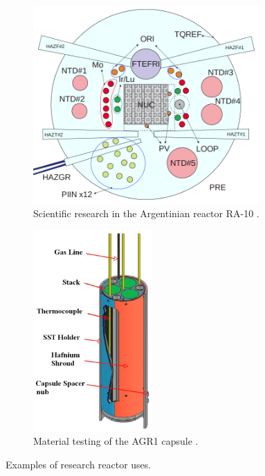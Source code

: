 \begin{figure}[htbp!] %
  \centering
  \begin{subfigure}[b]{0.49\textwidth}
    \centering
    \includegraphics[width=0.95\textwidth]{figures/RA-10}
    \caption{Scientific research in the Argentinian reactor RA-10 \cite{ra10}.}
  \end{subfigure}
  \hfill
  \begin{subfigure}[b]{0.49\textwidth}
    \centering
    \includegraphics[width=0.50\textwidth]{figures/agr1}
    \caption{Material testing of the \gls*{AGR1} capsule \cite{sterbentz_agr1_2018}.}
  \end{subfigure}
  \hfill
  \caption{Examples of research reactor uses.}
  \label{fig:intro-1}
\end{figure}


